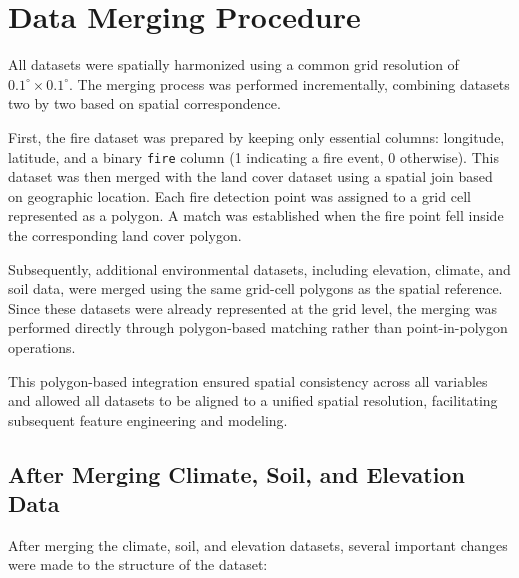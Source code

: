 \section{Data Merging Procedure}

All datasets were spatially harmonized using a common grid resolution of $0.1^\circ \times 0.1^\circ$. 
The merging process was performed incrementally, combining datasets two by two based on spatial correspondence.

First, the fire dataset was prepared by keeping only essential columns: longitude, latitude, and a binary \texttt{fire} column (1 indicating a fire event, 0 otherwise). 
This dataset was then merged with the land cover dataset using a spatial join based on geographic location. 
Each fire detection point was assigned to a grid cell represented as a polygon. 
A match was established when the fire point fell inside the corresponding land cover polygon.

Subsequently, additional environmental datasets, including elevation, climate, and soil data, were merged using the same grid-cell polygons as the spatial reference. 
Since these datasets were already represented at the grid level, the merging was performed directly through polygon-based matching rather than point-in-polygon operations.

This polygon-based integration ensured spatial consistency across all variables and allowed all datasets to be aligned to a unified spatial resolution, facilitating subsequent feature engineering and modeling.



\subsection{After Merging Climate, Soil, and Elevation Data}

After merging the climate, soil, and elevation datasets, several important changes were made to the structure of the dataset:

